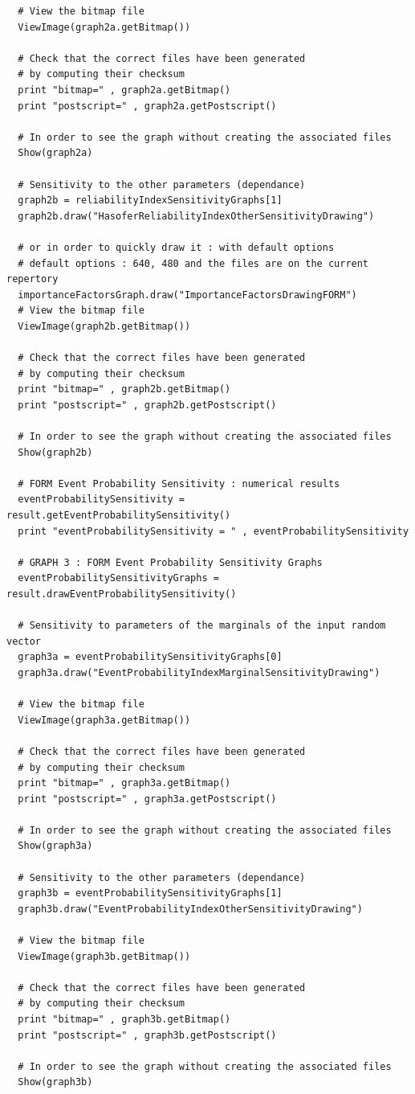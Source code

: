 \begin{lstlisting}
  # View the bitmap file
  ViewImage(graph2a.getBitmap())

  # Check that the correct files have been generated
  # by computing their checksum
  print "bitmap=" , graph2a.getBitmap()
  print "postscript=" , graph2a.getPostscript()

  # In order to see the graph without creating the associated files
  Show(graph2a)

  # Sensitivity to the other parameters (dependance)
  graph2b = reliabilityIndexSensitivityGraphs[1]
  graph2b.draw("HasoferReliabilityIndexOtherSensitivityDrawing")

  # or in order to quickly draw it : with default options
  # default options : 640, 480 and the files are on the current repertory
  importanceFactorsGraph.draw("ImportanceFactorsDrawingFORM")
  # View the bitmap file
  ViewImage(graph2b.getBitmap())

  # Check that the correct files have been generated
  # by computing their checksum
  print "bitmap=" , graph2b.getBitmap()
  print "postscript=" , graph2b.getPostscript()

  # In order to see the graph without creating the associated files
  Show(graph2b)

  # FORM Event Probability Sensitivity : numerical results
  eventProbabilitySensitivity = result.getEventProbabilitySensitivity()
  print "eventProbabilitySensitivity = " , eventProbabilitySensitivity

  # GRAPH 3 : FORM Event Probability Sensitivity Graphs
  eventProbabilitySensitivityGraphs = result.drawEventProbabilitySensitivity()

  # Sensitivity to parameters of the marginals of the input random vector
  graph3a = eventProbabilitySensitivityGraphs[0]
  graph3a.draw("EventProbabilityIndexMarginalSensitivityDrawing")

  # View the bitmap file
  ViewImage(graph3a.getBitmap())

  # Check that the correct files have been generated
  # by computing their checksum
  print "bitmap=" , graph3a.getBitmap()
  print "postscript=" , graph3a.getPostscript()

  # In order to see the graph without creating the associated files
  Show(graph3a)

  # Sensitivity to the other parameters (dependance)
  graph3b = eventProbabilitySensitivityGraphs[1]
  graph3b.draw("EventProbabilityIndexOtherSensitivityDrawing")

  # View the bitmap file
  ViewImage(graph3b.getBitmap())

  # Check that the correct files have been generated
  # by computing their checksum
  print "bitmap=" , graph3b.getBitmap()
  print "postscript=" , graph3b.getPostscript()

  # In order to see the graph without creating the associated files
  Show(graph3b)
\end{lstlisting}
\textspace\\


